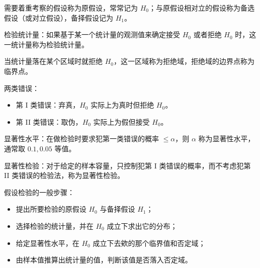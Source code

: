 需要着重考察的假设称为原假设，常常记为 $H_0$；与原假设相对立的假设称为备选假设（或对立假设），备择假设记为 $H_1$。

检验统计量：如果基于某一个统计量的观测值来确定接受 $H_0$ 或者拒绝 $H_0$ 时，这一统计量称为检验统计量。

当统计量落在某个区域时就拒绝 $H_0$，这一区域称为拒绝域，拒绝域的边界点称为临界点。

两类错误：
\begin{itemize}
	\item 第 I 类错误：弃真，$H_0$ 实际上为真时但拒绝 $H_0$。
	\item 第 II 类错误：取伪，$H_0$ 实际上为假但接受 $H_0$。
\end{itemize}

显著性水平：在做检验时要求犯第一类错误的概率 $\leqslant \alpha$，则 $\alpha$ 称为显著性水平，通常取 $0.1, 0.05$ 等值。

显著性检验：对于给定的样本容量，只控制犯第 I 类错误的概率，而不考虑犯第 II 类错误的检验法，称为显著性检验。

假设检验的一般步骤：
\begin{itemize}
	\item 提出所要检验的原假设 $H_0$ 与备择假设 $H_1$；
	\item 选择检验的统计量，并在 $H_0$ 成立下求出它的分布；
	\item 给定显著性水平，在 $H_0$ 成立下去欸的那个临界值和否定域；
	\item 由样本值推算出统计量的值，判断该值是否落入否定域。
\end{itemize}
